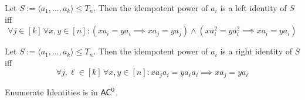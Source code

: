 \documentclass[10pt,a4paper]{amsart}
\newcommand{\AC}{\ensuremath\mathsf{AC}}
\begin{document}
\begin{lemma} \label{lem:leftid}
Let $S := \langle a_1, \dots, a_k \rangle \leq T_n$. Then the idempotent power of $a_i$ is a left identity of $S$ iff
\[ \forall j \in [k] \, \forall x,y \in [n]: (x a_i = y a_i \implies x a_j = y a_j) \wedge (x a_i^2 = y a_i^2 \implies x a_i = y a_i) \]
\end{lemma}

\begin{lemma} \label{lem:rightid}
Let $S := \langle a_1, \dots, a_k \rangle \leq T_n$. Then the idempotent power of $a_i$ is a right identity of $S$ iff
\[ \forall j,\ell \in [k] \, \forall x,y \in [n]: x a_j a_i = y a_\ell a_i \implies x a_j = y a_\ell \]
\end{lemma}

\begin{theorem}
Enumerate Identities is in $\AC^0$.
\end{theorem}
\end{document}
